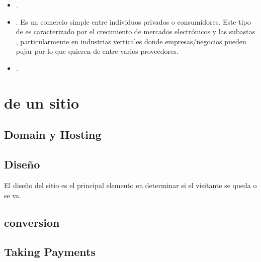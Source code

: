 \begin{itemize}
	\item \textbf{\gtog}.

	\item \textbf{\ctoc}. Es un comercio simple entre individuos privados o consumidores. Este tipo de \ecommerce es caracterizado por el crecimiento de mercados electrónicos y las subastas \online, particularmente en industrias verticales donde empresas/negocios pueden pujar por lo que quieren de entre varios proveedores.

	\item \textbf{\mcommerce}.
	
\end{itemize}

\section{\keyelements de un sitio \ecommerce \cite{inbook_ecommerce_keyelements}}

\subsection{Domain y Hosting}
\subsection{Diseño}
El diseño del sitio es el principal elemento en determinar si el visitante se queda o se va.

\subsection{\usability}

\subsection{conversion}

\subsection{\checkout}

\subsection{Taking Payments}

